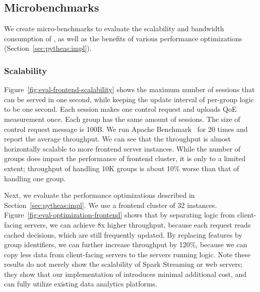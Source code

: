\subsection{Microbenchmarks}

\label{sec:eval:scale}

We create micro-benchmarks to evaluate the scalability and bandwidth
consumption of \name, as well as the benefits of various performance optimizations (Section~\ref{sec:pytheas:impl}).




\subsubsection{Scalability}
Figure~\ref{fig:eval-frontend-scalability} shows the maximum number of sessions that can be served in one second, while keeping the update interval of per-group logic to be one second. 
Each session makes one control request and uploads QoE measurement once. Each group has the same amount of sessions.
The size of control request message is 100B. We run Apache Benchmark~\cite{apache-benchmarking} for 20 times and report the average throughput.
We can see that the throughput is almost horizontally scalable to more frontend server instances. 
 While  the number of groups does impact the performance of frontend cluster, it is only to a limited extent; throughput of handling 10K groups is about 10\% worse than that of handling one group.

Next, we evaluate the performance optimizations described in Section~\ref{sec:pytheas:impl}.
We use a frontend cluster of 32 instances.
Figure~\ref{fig:eval-optimization-frontend} shows that by separating \mab logic from client-facing servers, we can achieve 8x higher throughput, because each request reads cached decisions, which are still frequently updated.
By replacing features by group identifiers, we can further increase throughput  by 120\%, because we can copy less data from client-facing servers to the servers running \mab logic.
Note these results do not merely show the scalability of Spark Streaming or web servers; they show that our implementation of \name introduces minimal additional cost, and can fully utilize existing data analytics platforms.

